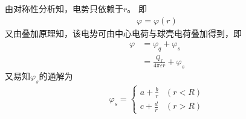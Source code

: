 \documentclass{phyasgn}
\begin{document}
\begin{sol}[2]
  由对称性分析知，电势只依赖于$r$。
  即
  \begin{align*}
    \varphi=\varphi(r)
  \end{align*}
  又由叠加原理知，该电势可由中心电荷与球壳电荷叠加得到，即
  \begin{align*}
    \varphi&=\varphi_q+\varphi_s\\
    &=\frac{Q_f}{4\pi\varepsilon r}+\varphi_s
  \end{align*}
  又易知$\varphi_s$的通解为
  \begin{align*}
    \varphi_s=\left\{\begin{matrix}
      a+\frac{b}{r}&(r<R)\\
      c+\frac{d}{r}&(r>R)
    \end{matrix}\right.
  \end{align*}
  

\end{sol}
\end{document}

